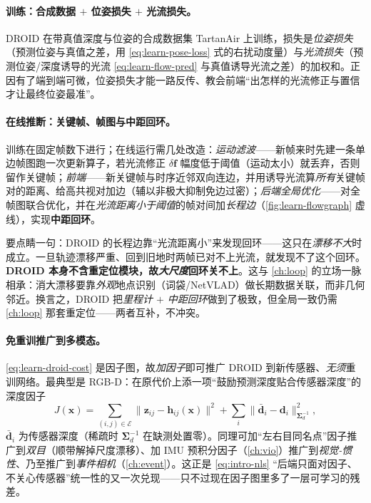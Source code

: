 \paragraph{训练：合成数据 $+$ 位姿损失 $+$ 光流损失。}
DROID 在带真值深度与位姿的合成数据集 TartanAir 上训练，损失是\emph{位姿损失}（预测位姿与真值之差，用 \cref{eq:learn-pose-loss} 式的右扰动度量）与\emph{光流损失}（预测位姿/深度诱导的光流 \cref{eq:learn-flow-pred} 与真值诱导光流之差）的加权和\cite{teed2021droid}。正因有了端到端可微，位姿损失才能一路反传、教会前端“出怎样的光流修正与置信才让最终位姿最准”。

\paragraph{在线推断：关键帧、帧图与中距回环。}
训练在固定帧数下进行；在线运行需几处改造\cite{teed2021droid}：\emph{运动滤波}——新帧来时先建一条单边帧图跑一次更新算子，若光流修正 $\delta\mathbf{f}$ 幅度低于阈值（运动太小）就丢弃，否则留作关键帧；\emph{前端}——新关键帧与时序近邻双向连边，并用诱导光流算\emph{所有}关键帧对的距离、给高共视对加边（辅以非极大抑制免边过密）；\emph{后端全局优化}——对全帧图联合优化，并在\emph{光流距离小于阈值}的帧对间加\emph{长程边}（\cref{fig:learn-flowgraph} 虚线），实现\textbf{中距回环}。

\begin{pitfall}
要点睛一句：DROID 的长程边靠“光流距离小”来发现回环——这只在\emph{漂移不大}时成立。一旦轨迹漂移严重、回到旧地时两帧已对不上光流，就发现不了这个回环。\textbf{DROID 本身不含重定位模块，故\emph{大尺度}回环关不上}\cite{teed2021droid}。这与 \cref{ch:loop} 的立场一脉相承：消大漂移要靠\emph{外观}地点识别（词袋/NetVLAD）做长期数据关联，而非几何邻近。换言之，DROID 把\emph{里程计 $+$ 中距回环}做到了极致，但全局一致仍需 \cref{ch:loop} 那套重定位——两者互补，不冲突。
\end{pitfall}

\paragraph{免重训推广到多模态。}
\cref{eq:learn-droid-cost} 是因子图，故\emph{加因子}即可推广 DROID 到新传感器、\emph{无须}重训网络\cite{teed2026boosting}。最典型是 RGB-D：在原代价上添一项“鼓励预测深度贴合传感器深度”的深度因子
\begin{equation}
  J(\mathbf{x})
  =\sum_{(i,j)\in\mathcal{E}}\big\|\mathbf{z}_{ij}-\mathbf{h}_{ij}(\mathbf{x})\big\|^2
  +\sum_{i}\big\|\bar{\mathbf{d}}_i-\mathbf{d}_i\big\|_{\boldsymbol\Sigma_d^{-1}}^2,
  \label{eq:learn-droid-rgbd}
\end{equation}
$\bar{\mathbf{d}}_i$ 为传感器深度（稀疏时 $\boldsymbol\Sigma_d^{-1}$ 在缺测处置零）。同理可加“左右目同名点”因子推广到\emph{双目}（顺带解掉尺度漂移）、加 IMU 预积分因子（\cref{ch:vio}）推广到\emph{视觉-惯性}、乃至推广到\emph{事件相机}（\cref{ch:event}）。这正是 \cref{eq:intro-nls} “后端只面对因子、不关心传感器”统一性的又一次兑现——只不过现在因子图里多了一层可学习的残差。

